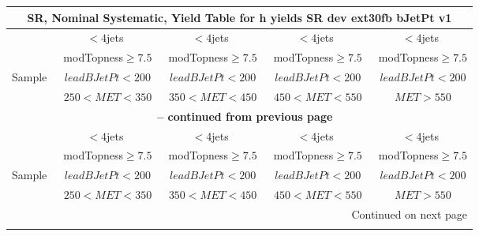\documentclass{article}
\begin{document}
 
 
 
 
\pagebreak 

 
 
 
 
\begin{longtable}{|l|c|c|c|c|} 
 
\multicolumn{5}{c}{ SR, Nominal Systematic, Yield Table for h yields SR dev ext30fb bJetPt v1 }\\* \hline 
  & $<4$jets  & $<4$jets  & $<4$jets  & $<4$jets \\* 
  & ~modTopness$\ge7.5$  & ~modTopness$\ge7.5$  & ~modTopness$\ge7.5$  & ~modTopness$\ge7.5$ \\* 
Sample  & ~$leadBJetPt<200$  & ~$leadBJetPt<200$  & ~$leadBJetPt<200$  & ~$leadBJetPt<200$ \\* 
  & ~$250<MET<350$  & ~$350<MET<450$  & ~$450<MET<550$  & ~$MET>550$ \\* 
\hline \hline 
\endfirsthead 
 
\multicolumn{5}{c}{{\bfseries \tablename\ \thetable{} -- continued from previous page}}\\* \hline 
  & $<4$jets  & $<4$jets  & $<4$jets  & $<4$jets \\* 
  & ~modTopness$\ge7.5$  & ~modTopness$\ge7.5$  & ~modTopness$\ge7.5$  & ~modTopness$\ge7.5$ \\* 
Sample  & ~$leadBJetPt<200$  & ~$leadBJetPt<200$  & ~$leadBJetPt<200$  & ~$leadBJetPt<200$ \\* 
  & ~$250<MET<350$  & ~$350<MET<450$  & ~$450<MET<550$  & ~$MET>550$ \\* 
\hline \hline 
\endhead 
 
\multicolumn{5}{|r|}{{Continued on next page}}\\* \hline 
\endfoot 
 
 
\endlastfoot 
 

\end{longtable}
\end{document}
